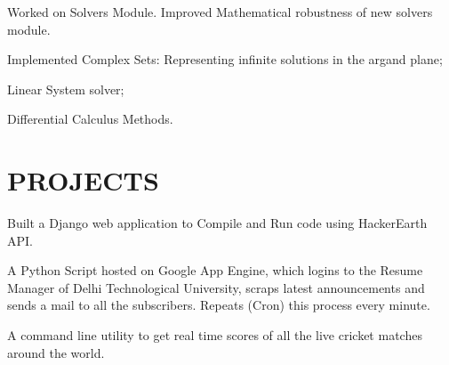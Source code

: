 \documentclass[]{deedy-resume-openfont}
\begin{document}
\begin{minipage}[t]{0.66\textwidth}
\begin{tightemize}
\item Worked on Solvers Module. Improved Mathematical robustness of new solvers module.
\item Implemented Complex Sets: Representing infinite solutions in the argand plane;
\item Linear System solver;
\item Differential Calculus Methods.\end{tightemize}
\sectionsep



\section{PROJECTS}
Built a Django web application to Compile and Run code using HackerEarth API.
\sectionsep

A Python Script hosted on Google App Engine, which logins to the Resume Manager of Delhi Technological University, scraps latest announcements and sends a mail to all the subscribers. Repeats (Cron) this process every minute.
\sectionsep

A command line utility to get real time scores of all the live cricket matches around the world.

\sectionsep





\end{minipage}
\end{document}
